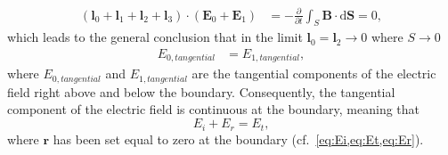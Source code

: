 \documentclass[10pt,twoside, b5paper,pdftex]{report}
\newcommand{\B}[1]{\left( #1 \right)}
\begin{document}
\begin{align}
\B{\mathbf{l}_{0} + \mathbf{l}_{1} + \mathbf{l}_{2} + \mathbf{l}_{3}}\cdot\B{\mathbf{E}_{0} + \mathbf{E}_{1}} &= -\frac{\partial}{\partial t} \int_{S} \mathbf{B} \cdot \mbox{d}\mathbf{S} = 0 ,
\end{align}
which leads to the general conclusion that in the limit $\mathbf{l}_{0} = \mathbf{l}_{2} \to 0$ where $S \to 0$
\begin{align}
    E_{0, tangential} &= E_{1, tangential} \label{eq:bound_cond_1},
\end{align}
where $E_{0, tangential}$ and $E_{1, tangential}$ are the tangential components of the electric field right above and below the boundary. Consequently, the tangential component of the electric field is continuous at the boundary, meaning that
\begin{equation}\label{eq:cond0}
E_{i} + E_{r} = E_{t},
\end{equation}
where  $\mathbf{r}$ has been set equal to zero at the boundary (cf.~\cref{eq:Ei,eq:Et,eq:Er}). 
\end{document}
